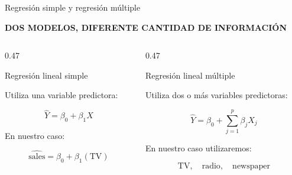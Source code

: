 \documentclass[aspectratio=169,11pt]{beamer}
\newcommand{\kicker}[1]{%
  {\scriptsize\bfseries\color{cAcc}\MakeUppercase{#1}}%
  \par\vspace{0.2em}%
}
\newenvironment{cerrado}[1]
  {\begin{block}{#1}
   \begin{minipage}{\linewidth}
   \raggedright}
  {\end{minipage}
   \end{block}}
\begin{document}
\begin{frame}{Regresión simple y regresión múltiple}

  \begin{center}
    \begin{minipage}{0.90\textwidth}

      \small

      \kicker{DOS MODELOS, DIFERENTE CANTIDAD DE INFORMACIÓN}

      \begin{columns}[T,onlytextwidth]

        \begin{column}{0.47\textwidth}

          \begin{cerrado}{Regresión lineal simple}

            Utiliza una variable predictora:

            \[
              \hat{Y}=\beta_0+\beta_1X
            \]

            En nuestro caso:

            \[
              \widehat{\text{sales}}
              =
              \beta_0+\beta_1(\text{TV})
            \]

          \end{cerrado}

        \end{column}

        \begin{column}{0.47\textwidth}

          \begin{cerrado}{Regresión lineal múltiple}

            Utiliza dos o más variables predictoras:

            \[
              \hat{Y}
              =
              \beta_0+\sum_{j=1}^{p}\beta_jX_j
            \]

            En nuestro caso utilizaremos:

            \[
              \text{TV},\quad
              \text{radio},\quad
              \text{newspaper}
            \]

          \end{cerrado}

        \end{column}

      \end{columns}

      \vspace{0.0em}


\end{minipage}
\end{center}
\end{frame}
\end{document}
